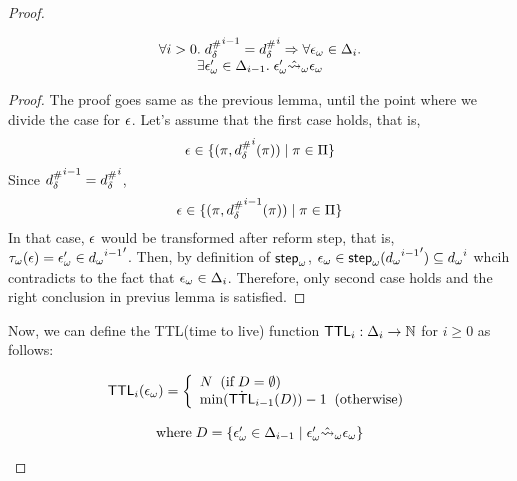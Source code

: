 \begin{proof}
\begin{corollary}
  \[
    \begin{array}{c}
      \forall i > 0. \; {{d}^{\#}_\delta}^{i-1} = {{d}^{\#}_\delta}^i \Rightarrow
      \forall {\epsilon}_\omega \in \Delta_i. \\
      \exists {\epsilon}_\omega' \in \Delta_{i-1} . \; {\epsilon}_\omega' \hat{\leadsto}_\omega {\epsilon}_\omega
    \end{array}
  \]
\end{corollary}
\begin{proof}
  The proof goes same as the previous lemma, until the point where we divide
  the case for $\epsilon$. Let's assume that the first case holds, that is,
  \[
    \epsilon \in \{ (\pi, {{d}^{\#}_\delta}^i(\pi)) \mid \pi \in \Pi \}
  \]
  Since ${{d}^{\#}_\delta}^{i-1} = {{d}^{\#}_\delta}^i$,
  \[
    \epsilon \in \{ (\pi, {{d}^{\#}_\delta}^{i-1}(\pi)) \mid \pi \in \Pi \}
  \]
  In that case, $\epsilon$ would be transformed after reform step, that is,
  ${\tau}_\omega(\epsilon) = {\epsilon}_\omega' \in {{{d}_\omega}^{i-1}}'$.
  Then, by definition of ${\textsf{step}}_\omega$,
  ${\epsilon}_\omega \in {\textsf{step}}_\omega({{{d}_\omega}^{i-1}}') \subseteq {{d}_\omega}^i$
  whcih contradicts to the fact that ${\epsilon}_\omega \in \Delta_i$.
  Therefore, only second case holds and the right conclusion in previus lemma is satisfied.
\end{proof}


Now, we can define the TTL(time to live) function
$\textsf{TTL}_i: \Delta_i \rightarrow \mathbb{N}$ for $i \geq 0$ as follows:
\begin{definition}
  \[
    \begin{array}{c} 
      \textsf{TTL}_i({\epsilon}_\omega) = \left \{
      \begin{array}{l}
        N \;\; ( \text{if} \; D = \emptyset)\\
        \text{min}(\dot{\textsf{TTL}}_{i-1}(D)) - 1
        \;\; ( \text{otherwise})
      \end{array}
      \right. \\
      \\
      \text{where} \; D = 
      \{{\epsilon}_\omega' \in \Delta_{i-1} \mid {\epsilon}_\omega' \hat{\leadsto}_\omega {\epsilon}_\omega\}
    \end{array}
  \]
\end{definition}


\end{proof}
